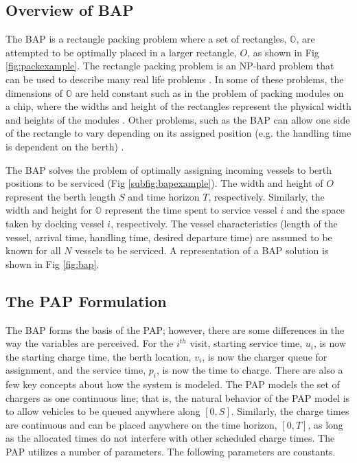 \documentclass[utf8]{FrontiersinHarvard}
\let\cite\citep                                                                 %
\begin{document}
\subsection{Overview of BAP}
The BAP is a rectangle packing problem where a set of rectangles, $\mathbb{O}$, are attempted to be optimally placed in
a larger rectangle, $O$, as shown in Fig \ref{fig:packexample}. The rectangle packing problem is an NP-hard problem that
can be used to describe many real life problems \cite{Bruin2013,Murata1995}. In some of these problems, the dimensions
of $\mathbb{O}$ are held constant such as in the problem of packing modules on a chip, where the widths and height of
the rectangles represent the physical width and heights of the modules \cite{Murata1995}. Other problems, such as the
BAP can allow one side of the rectangle to vary depending on its assigned position (e.g. the handling time is dependent
on the berth) \cite{Buhrkal2010}.

The BAP solves the problem of optimally assigning incoming vessels to berth positions to be serviced (Fig
\ref{subfig:bapexample}). The width and height of $O$ represent the berth length $S$ and time horizon $T$, respectively.
Similarly, the width and height for $\mathbb{O}$ represent the time spent to service vessel $i$ and the space taken by
docking vessel $i$, respectively. The vessel characteristics (length of the vessel, arrival time, handling time, desired
departure time) are assumed to be known for all $N$ vessels to be serviced. A representation of a BAP solution is shown
in Fig \ref{fig:bap}.

\subsection{The PAP Formulation}
The BAP forms the basis of the PAP; however, there are some differences in the way the variables are perceived. For the
$i^{th}$ visit, starting service time, $u_i$, is now the starting charge time, the berth location, $v_i$, is now the
charger queue for assignment, and the service time, $p_i$, is now the time to charge. There are also a few key concepts
about how the system is modeled. The PAP models the set of chargers as one continuous line; that is, the natural
behavior of the PAP model is to allow vehicles to be queued anywhere along $[0,S]$. Similarly, the charge times are
continuous and can be placed anywhere on the time horizon, $[0,T]$, as long as the allocated times do not interfere with
other scheduled charge times. The PAP utilizes a number of parameters. The following parameters are constants.
\end{document}
